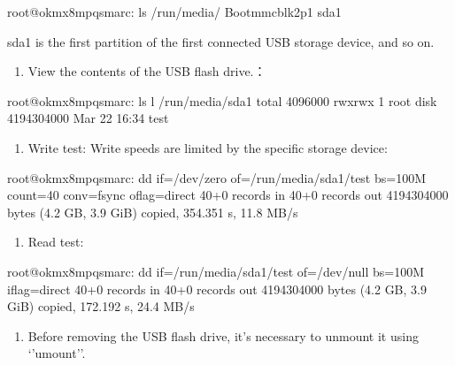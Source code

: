 \documentclass[letterpaper,10pt,openany,english]{sphinxmanual}
\begin{document}
\begin{sphinxVerbatim}[commandchars=\\\{\}]
root@ok\PYGZhy{}mx8mpq\PYGZhy{}smarc:\PYGZti{}\PYGZsh{} ls /run/media/
Boot\PYGZhy{}mmcblk2p1  sda1
\end{sphinxVerbatim}

\sphinxAtStartPar
sda1 is the first partition of the first connected USB storage device, and so on.
\begin{enumerate}
%
\setcounter{enumi}{2}
\item {} 
\sphinxAtStartPar
View the contents of the USB flash drive.：

\end{enumerate}

\begin{sphinxVerbatim}[commandchars=\\\{\}]
root@ok\PYGZhy{}mx8mpq\PYGZhy{}smarc:\PYGZti{}\PYGZsh{} ls \PYGZhy{}l /run/media/sda1
total 4096000
\PYGZhy{}rwxrwx\PYGZhy{}\PYGZhy{}\PYGZhy{} 1 root disk 4194304000 Mar 22 16:34 test
\end{sphinxVerbatim}
\begin{enumerate}
%
\setcounter{enumi}{3}
\item {} 
\sphinxAtStartPar
Write test: Write speeds are limited by the specific storage device:

\end{enumerate}

\begin{sphinxVerbatim}[commandchars=\\\{\}]
root@ok\PYGZhy{}mx8mpq\PYGZhy{}smarc:\PYGZti{}\PYGZsh{} dd if=/dev/zero of=/run/media/sda1/test bs=100M count=40 \PYGZbs{}
conv=fsync oflag=direct
40+0 records in
40+0 records out
4194304000 bytes (4.2 GB, 3.9 GiB) copied, 354.351 s, 11.8 MB/s
\end{sphinxVerbatim}
\begin{enumerate}
%
\setcounter{enumi}{4}
\item {} 
\sphinxAtStartPar
Read test:

\end{enumerate}

\sphinxAtStartPar
{}

\begin{sphinxVerbatim}[commandchars=\\\{\}]
root@ok\PYGZhy{}mx8mpq\PYGZhy{}smarc:\PYGZti{}\PYGZsh{} dd if=/run/media/sda1/test of=/dev/null bs=100M iflag=direct
40+0 records in
40+0 records out
4194304000 bytes (4.2 GB, 3.9 GiB) copied, 172.192 s, 24.4 MB/s
\end{sphinxVerbatim}
\begin{enumerate}
%
\setcounter{enumi}{5}
\item {} 
\sphinxAtStartPar
Before removing the USB flash drive, it’s necessary to unmount it using ‘’umount’’.

\end{enumerate}
\end{document}
